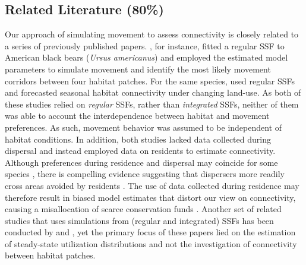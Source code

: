 \documentclass[abstract=on,10pt,a4paper,bibliography=totocnumbered]{article}
\begin{document}
\subsection{Related Literature (80\%)}
Our approach of simulating movement to assess connectivity is closely related to
a series of previously published papers. \cite{Clark.2015}, for instance, fitted
a regular SSF to American black bears (\textit{Ursus americanus}) and employed
the estimated model parameters to simulate movement and identify the most likely
movement corridors between four habitat patches. For the same species,
\cite{Zeller.2020} used regular SSFs and forecasted seasonal habitat
connectivity under changing land-use. As both of these studies relied on
\textit{regular} SSFs, rather than \textit{integrated} SSFs, neither of them was
able to account the interdependence between habitat and movement preferences. As
such, movement behavior was assumed to be independent of habitat conditions. In
addition, both studies lacked data collected during dispersal and instead
employed data on residents to estimate connectivity. Although preferences during
residence and dispersal may coincide for some species \citep{Fattebert.2015},
there is compelling evidence suggesting that dispersers more readily cross areas
avoided by residents \citep{Elliot.2014, Gaston.2016, Abrahms.2017,
Keeley.2017}. The use of data collected during residence may therefore result in
biased model estimates that distort our view on connectivity, causing a
misallocation of scarce conservation funds \citep{Elliot.2014}. Another set of
related studies that uses simulations from (regular and integrated) SSFs has
been conducted by \cite{Potts.2013} and \cite{Signer.2017}, yet the primary
focus of these papers lied on the estimation of steady-state utilization
distributions and not the investigation of connectivity between habitat patches.
\end{document}
